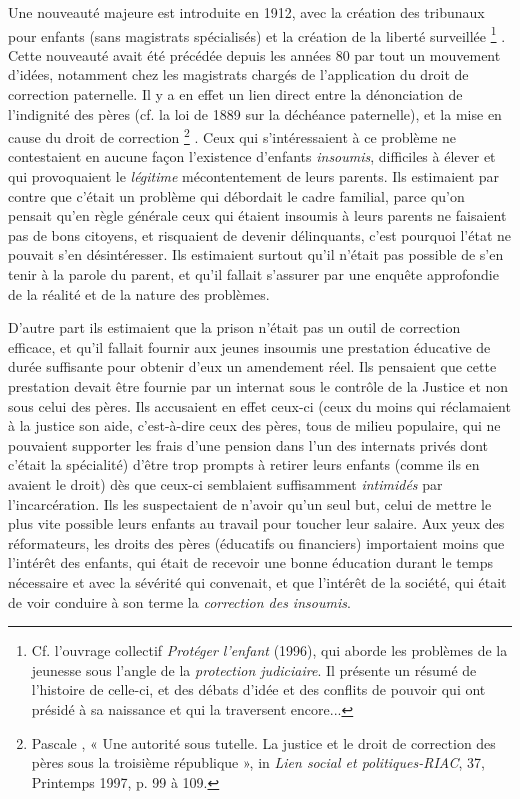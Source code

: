  Une nouveauté majeure est introduite en 1912, avec la création des tribunaux pour enfants (sans magistrats spécialisés) et la création de la liberté surveillée%
\footnote{Cf. l'ouvrage collectif \emph{Protéger l'enfant} (1996), qui aborde les problèmes de la jeunesse sous l'angle de la \emph{protection judiciaire}. Il présente un résumé de l'histoire de celle-ci, et des débats d'idée et des conflits de pouvoir qui ont présidé à sa naissance et qui la traversent encore...}%
. Cette nouveauté avait été précédée depuis les années 80 par tout un mouvement d'idées, notamment chez les magistrats chargés de l'application du droit de correction paternelle. Il y a en effet un lien direct entre la dénonciation de l'indignité des pères (cf. la loi de 1889 sur la déchéance paternelle), et la mise en cause du droit de correction%
\footnote{Pascale , « Une autorité sous tutelle. La justice et le droit de correction des pères sous la troisième république », in \emph{Lien social et politiques-RIAC}, 37, Printemps 1997, p. 99 à 109.}%
. Ceux qui s'intéressaient à ce problème ne contestaient en aucune façon l'existence d'enfants \emph{insoumis}, difficiles à élever et qui provoquaient le \emph{légitime} mécontentement de leurs parents. Ils estimaient par contre que c'était un problème qui débordait le cadre familial, parce qu'on pensait qu'en règle générale ceux qui étaient insoumis à leurs parents ne faisaient pas de bons citoyens, et risquaient de devenir délinquants, c'est pourquoi l'état ne pouvait s'en désintéresser. Ils estimaient surtout qu'il n'était pas possible de s'en tenir à la parole du parent, et qu'il fallait s'assurer par une enquête approfondie de la réalité et de la nature des problèmes. 

 D'autre part ils estimaient que la prison n'était pas un outil de correction efficace, et qu'il fallait fournir aux jeunes insoumis une prestation éducative de durée suffisante pour obtenir d'eux un amendement réel. Ils pensaient que cette prestation devait être fournie par un internat sous le contrôle de la Justice et non sous celui des pères. Ils accusaient en effet ceux-ci (ceux du moins qui réclamaient à la justice son aide, c'est-à-dire ceux des pères, tous de milieu populaire, qui ne pouvaient supporter les frais d'une pension dans l'un des internats privés dont c'était la spécialité) d'être trop prompts à retirer leurs enfants (comme ils en avaient le droit) dès que ceux-ci semblaient suffisamment \emph{intimidés} par l'incarcération. Ils les suspectaient de n'avoir qu'un seul but, celui de mettre le plus vite possible leurs enfants au travail pour toucher leur salaire. Aux yeux des réformateurs, les droits des pères (éducatifs ou financiers) importaient moins que l'intérêt des enfants, qui était de recevoir une bonne éducation durant le temps nécessaire et avec la sévérité qui convenait, et que l'intérêt de la société, qui était de voir conduire à son terme la \emph{correction des insoumis}. 

